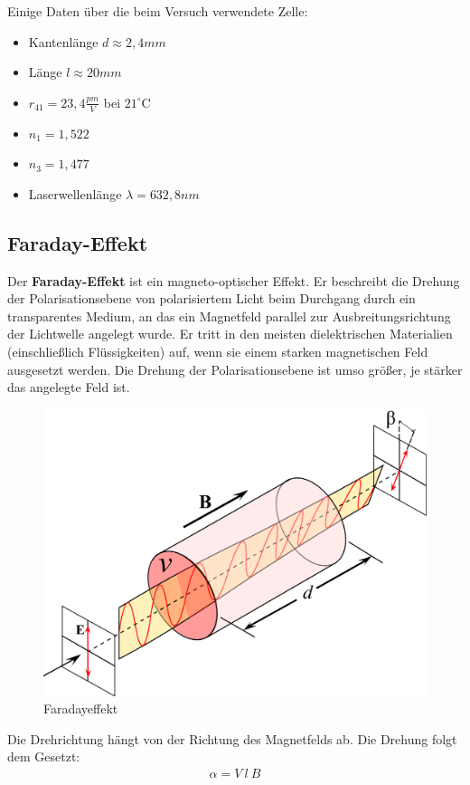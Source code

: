 \documentclass[12pt]{article}
\begin{document}
Einige Daten über die beim Versuch verwendete Zelle:
\begin{itemize}
 \item Kantenlänge $d \approx 2,4 mm$
 \item Länge $l \approx 20 mm$
 \item $r_{41} = 23,4 \frac{pm}{V}$ bei $21^\circ$C
 \item $n_1 = 1,522$
 \item $n_3 = 1,477$
 \item Laserwellenlänge $\lambda = 632,8 nm$
\end{itemize}

\subsection{Faraday-Effekt}
Der \textbf{Faraday-Effekt} ist ein magneto-optischer Effekt. Er beschreibt die Drehung der Polarisationsebene von polarisiertem Licht beim Durchgang durch ein transparentes Medium, an das ein Magnetfeld parallel zur Ausbreitungsrichtung der Lichtwelle angelegt wurde. Er tritt in den meisten dielektrischen Materialien (einschließlich Flüssigkeiten) auf, wenn sie einem starken magnetischen Feld ausgesetzt werden. Die Drehung der Polarisationsebene ist umso größer, je stärker das angelegte Feld ist.

\begin{figure}[H]
\centering
\includegraphics[width=0.8\linewidth]{pictures/faraday-effect.eps}
\caption{Faradayeffekt}
\end{figure}

Die Drehrichtung hängt von der Richtung des Magnetfelds ab. Die Drehung folgt dem Gesetzt:
\begin{align}
 \alpha = V ~ l ~ B
\end{align}
\end{document}
